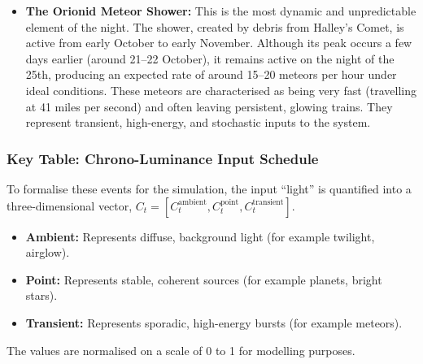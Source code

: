 \documentclass{article}
\begin{document}
\begin{itemize}
\begin{itemize}
    \end{itemize}
    \item \textbf{The Orionid Meteor Shower:} This is the most dynamic and unpredictable element of the night. The shower, created by debris from Halley's Comet, is active from early October to early November. Although its peak occurs a few days earlier (around 21--22 October), it remains active on the night of the 25th, producing an expected rate of around 15--20 meteors per hour under ideal conditions. These meteors are characterised as being very fast (travelling at 41 miles per second) and often leaving persistent, glowing trains. They represent transient, high-energy, and stochastic inputs to the system.
\end{itemize}

\subsubsection{Key Table: Chrono-Luminance Input Schedule}

To formalise these events for the simulation, the input ``light'' is quantified into a three-dimensional vector, $C_t = [C^{\text{ambient}}_t, C^{\text{point}}_t, C^{\text{transient}}_t]$.

\begin{itemize}
    \item \textbf{Ambient:} Represents diffuse, background light (for example twilight, airglow).
    \item \textbf{Point:} Represents stable, coherent sources (for example planets, bright stars).
    \item \textbf{Transient:} Represents sporadic, high-energy bursts (for example meteors).
\end{itemize}

The values are normalised on a scale of 0 to 1 for modelling purposes.
\end{document}
